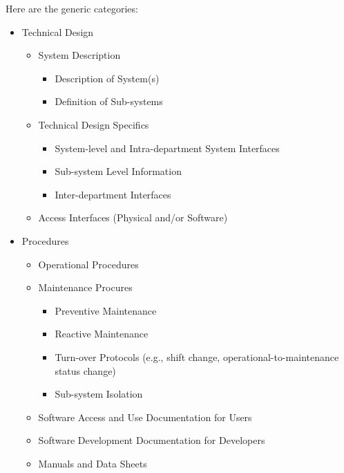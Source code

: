 Here are the generic categories:

\begin{small}

\begin{itemize}
  \item Technical Design
	\begin{itemize}

	  \item System Description
		\begin{itemize}
		  \item Description of System(s)
		  \item Definition of Sub-systems
		\end{itemize}

	  \item Technical Design Specifics
		\begin{itemize}
		  \item System-level and Intra-department System Interfaces
		  \item Sub-system Level Information
		  \item Inter-department Interfaces
		\end{itemize}
	  \item Access Interfaces (Physical and/or Software)
	\end{itemize}


  \item Procedures
	\begin{itemize}

	  \item Operational Procedures

	  \item Maintenance Procures
		\begin{itemize}
		  \item Preventive Maintenance
		  \item Reactive Maintenance
		  \item Turn-over Protocols (e.g., shift change, operational-to-maintenance status change)
		  \item Sub-system Isolation
		\end{itemize}

	  \item Software Access and Use Documentation for Users

	  \item Software Development Documentation for Developers

	  \item Manuals and Data Sheets
	\end{itemize}



\end{itemize}
\end{small}
